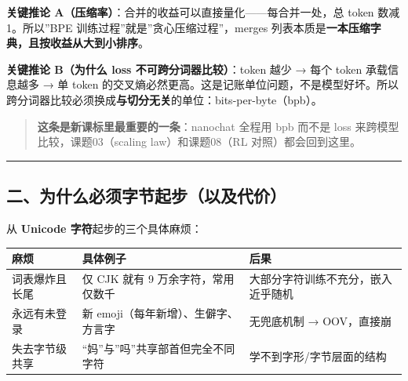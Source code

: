 \documentclass[
  chinese,
  11pt,
]{ctexart}
\newcounter{none} %
\begin{document}
\textbf{关键推论 A（压缩率）}：合并的收益可以直接量化------每合并一处，总 token 数减 1。所以''BPE 训练过程''就是''贪心压缩过程''，merges 列表本质是\textbf{一本压缩字典，且按收益从大到小排序}。

\textbf{关键推论 B（为什么 loss 不可跨分词器比较）}：token 越少 → 每个 token 承载信息越多 → 单 token 的交叉熵必然更高。这是记账单位问题，不是模型好坏。所以跨分词器比较必须换成\textbf{与切分无关}的单位：bits-per-byte（bpb）。

\begin{quote}
\textbf{这条是新课标里最重要的一条}：nanochat 全程用 bpb 而不是 loss 来跨模型比较，课题03（scaling law）和课题08（RL 对照）都会回到这里。
\end{quote}

\begin{center}\rule{0.5\linewidth}{0.5pt}\end{center}

\subsection{二、为什么必须字节起步（以及代价）}\label{ux4e8cux4e3aux4ec0ux4e48ux5fc5ux987bux5b57ux8282ux8d77ux6b65ux4ee5ux53caux4ee3ux4ef7}

从 \textbf{Unicode 字符}起步的三个具体麻烦：

{\def\LTcaptype{none} %
\begin{longtable}[]{@{}
  >{\raggedright\arraybackslash}p{}
  >{\raggedright\arraybackslash}p{}
  >{\raggedright\arraybackslash}p{}@{}}
\toprule\noalign{}
\begin{minipage}[b]{\linewidth}\raggedright
麻烦
\end{minipage} & \begin{minipage}[b]{\linewidth}\raggedright
具体例子
\end{minipage} & \begin{minipage}[b]{\linewidth}\raggedright
后果
\end{minipage} \\
\midrule\noalign{}
\endhead
\bottomrule\noalign{}
\endlastfoot
词表爆炸且长尾 & 仅 CJK 就有 9 万余字符，常用仅数千 & 大部分字符训练不充分，嵌入近乎随机 \\
永远有未登录 & 新 emoji（每年新增）、生僻字、方言字 & 无兜底机制 → OOV，直接崩 \\
失去字节级共享 & ``妈''与''吗''共享部首但完全不同字符 & 学不到字形/字节层面的结构 \\
\end{longtable}
}
\end{document}
